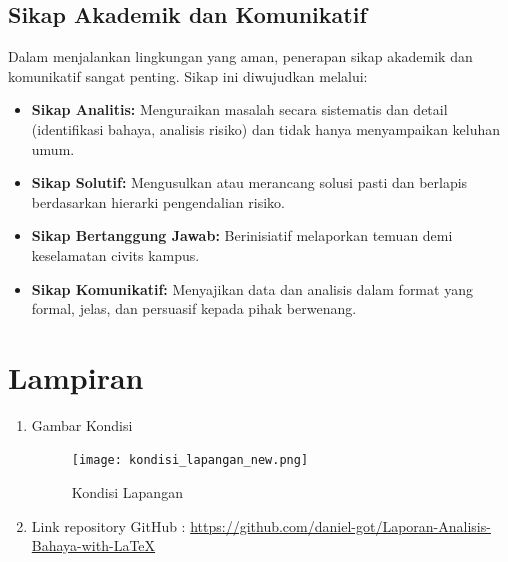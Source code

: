 \documentclass[a4paper, 12pt]{article}
\begin{document}
\subsection{Sikap Akademik dan Komunikatif}
Dalam menjalankan lingkungan yang aman, penerapan sikap akademik dan komunikatif sangat penting. Sikap ini diwujudkan melalui:
\begin{itemize}
    \item \textbf{Sikap Analitis:} Menguraikan masalah secara sistematis dan detail (identifikasi bahaya, analisis risiko) dan tidak hanya menyampaikan keluhan umum.
    \item \textbf{Sikap Solutif:} Mengusulkan atau merancang solusi pasti dan berlapis berdasarkan hierarki pengendalian risiko.
    \item \textbf{Sikap Bertanggung Jawab:} Berinisiatif melaporkan temuan demi keselamatan civits kampus.
    \item \textbf{Sikap Komunikatif:} Menyajikan data dan analisis dalam format yang formal, jelas, dan persuasif kepada pihak berwenang.
\end{itemize}
\section{Lampiran}
\begin{enumerate}
  \item Gambar Kondisi 

  \begin{figure}[H]
    \centering
    \texttt{[image: kondisi\_lapangan\_new.png]}
    \caption{Kondisi Lapangan}
  \end{figure}  
\item Link repository GitHub : \url{https://github.com/daniel-got/Laporan-Analisis-Bahaya-with-LaTeX}

\end{enumerate}

\end{document}
